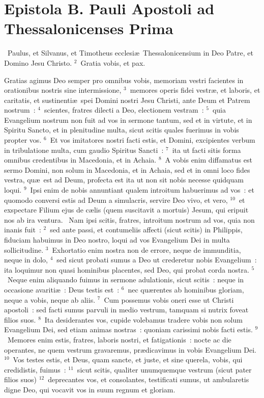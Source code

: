 \clearpage
{\centering \section*{Epistola B. Pauli Apostoli ad Thessalonicenses Prima}}\thispagestyle{empty}

~Paulus, et Silvanus, et Timotheus ecclesi\ae\ Thessalonicensium in Deo Patre, et Domino Jesu Christo.
${}^{2}$~Gratia vobis, et pax.

 Gratias agimus Deo semper pro omnibus vobis, memoriam vestri facientes in orationibus nostris sine intermissione,
${}^{3}$~memores operis fidei vestr\ae , et laboris, et caritatis, et sustinenti\ae\ spei Domini nostri Jesu Christi, ante Deum et Patrem nostrum~:
${}^{4}$~scientes, fratres dilecti a Deo, electionem vestram~:
${}^{5}$~quia Evangelium nostrum non fuit ad vos in sermone tantum, sed et in virtute, et in Spiritu Sancto, et in plenitudine multa, sicut scitis quales fuerimus in vobis propter vos.
${}^{6}$~Et vos imitatores nostri facti estis, et Domini, excipientes verbum in tribulatione multa, cum gaudio Spiritus Sancti~:
${}^{7}$~ita ut facti sitis forma omnibus credentibus in Macedonia, et in Achaia.
${}^{8}$~A vobis enim diffamatus est sermo Domini, non solum in Macedonia, et in Achaia, sed et in omni loco fides vestra, qu\ae\ est ad Deum, profecta est ita ut non sit nobis necesse quidquam loqui.
${}^{9}$~Ipsi enim de nobis annuntiant qualem introitum habuerimus ad vos~: et quomodo conversi estis ad Deum a simulacris, servire Deo vivo, et vero,
${}^{10}$~et exspectare Filium ejus de c\ae lis (quem suscitavit a mortuis) Jesum, qui eripuit nos ab ira ventura.
~Nam ipsi scitis, fratres, introitum nostrum ad vos, quia non inanis fuit~:
${}^{2}$~sed ante passi, et contumeliis affecti (sicut scitis) in Philippis, fiduciam habuimus in Deo nostro, loqui ad vos Evangelium Dei in multa sollicitudine.
${}^{3}$~Exhortatio enim nostra non de errore, neque de immunditia, neque in dolo,
${}^{4}$~sed sicut probati sumus a Deo ut crederetur nobis Evangelium~: ita loquimur non quasi hominibus placentes, sed Deo, qui probat corda nostra.
${}^{5}$~Neque enim aliquando fuimus in sermone adulationis, sicut scitis~: neque in occasione avariti\ae~: Deus testis est~:
${}^{6}$~nec qu\ae rentes ab hominibus gloriam, neque a vobis, neque ab aliis.
${}^{7}$~Cum possemus vobis oneri esse ut Christi apostoli~: sed facti sumus parvuli in medio vestrum, tamquam si nutrix foveat filios suos.
${}^{8}$~Ita desiderantes vos, cupide volebamus tradere vobis non solum Evangelium Dei, sed etiam animas nostras~: quoniam carissimi nobis facti estis.
${}^{9}$~Memores enim estis, fratres, laboris nostri, et fatigationis~: nocte ac die operantes, ne quem vestrum gravaremus, pr\ae dicavimus in vobis Evangelium Dei.
${}^{10}$~Vos testes estis, et Deus, quam sancte, et juste, et sine querela, vobis, qui credidistis, fuimus~:
${}^{11}$~sicut scitis, qualiter unumquemque vestrum (sicut pater filios suos)
${}^{12}$~deprecantes vos, et consolantes, testificati sumus, ut ambularetis digne Deo, qui vocavit vos in suum regnum et gloriam.


